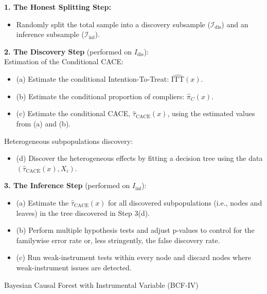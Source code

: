 \begin{algorithm}[H]
    \footnotesize
    \DontPrintSemicolon
    \SetAlgoLined
    \LinesNotNumbered
    \BlankLine
    \textbf{1. The Honest Splitting Step:} \\
    \begin{itemize}
        \item Randomly split the total sample into a discovery subsample ($\mathcal{I}_{\text{dis}}$) and an inference subsample ($\mathcal{I}_{\text{inf}}$).
    \end{itemize}
    \BlankLine
    \textbf{2. The Discovery Step} (performed on $I_{\text{dis}}$): \\
    Estimation of the Conditional CACE:
    \begin{itemize}
        \item (a) Estimate the conditional Intention-To-Treat: $\widehat{\text{ITT}}(x)$.
        \item (b) Estimate the conditional proportion of compliers: $\widehat{\pi}_C(x)$.
        \item (c) Estimate the conditional CACE, $\widehat{\tau}_{\text{CACE}}(x)$, using the estimated values from (a) and (b).
    \end{itemize}
    Heterogeneous subpopulations discovery:
    \begin{itemize}
        \item (d) Discover the heterogeneous effects by fitting a decision tree using the data $(\widehat{\tau}_{\text{CACE}}(x), X_i)$.
    \end{itemize}
    \BlankLine
    \textbf{3. The Inference Step} (performed on $I_{\text{inf}}$): \\
    \begin{itemize}
        \item (a) Estimate the $\widehat{\tau}_{\text{CACE}}(x)$ for all discovered subpopulations (i.e., nodes and leaves) in the tree discovered in Step 3(d).
        \item (b) Perform multiple hypothesis tests and adjust p-values to control for the familywise error rate or, less stringently, the false discovery rate. 
        \item (c) Run weak-instrument tests within every node and discard nodes where weak-instrument issues are detected.
    \end{itemize}
    \caption{Bayesian Causal Forest with Instrumental Variable (BCF-IV)}
    \label{algo:BCF-IV}
\end{algorithm}


